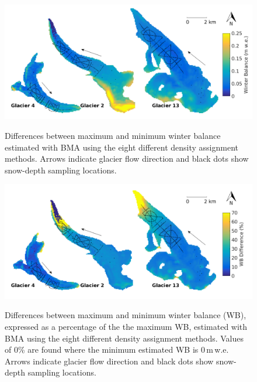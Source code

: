 \documentclass{sfuthesis}
\newcommand{\topomap}{Arrows indicate glacier flow direction and black dots show snow-depth sampling locations. }
\begin{document}
{\begin{figure}[H]
	\centering
	\includegraphics[width =\textwidth]{BMS_SWEdifferenceMap.png}\\
	\caption[Differences between maximum and minimum winter balance estimated with BMA using the eight different density assignment methods]{Differences between maximum and minimum winter balance estimated with BMA using the eight different density assignment methods. \topomap}
	\label{fig:BMS_SWEdiffMap}
\end{figure} 
 
 \begin{figure}[H]
	\centering
	\includegraphics[width =\textwidth]{BMS_SWEdifferenceMap_percent.png}\\
	\caption[Differences between maximum and minimum winter balance (WB), expressed as a percentage of the the maximum WB, estimated with BMA using the eight different density assignment methods]{Differences between maximum and minimum winter balance (WB), expressed as a percentage of the the maximum WB, estimated with BMA using the eight different density assignment methods. Values of 0\% are found where the minimum estimated WB is 0\,m\,w.e. \topomap}
	\label{fig:BMS_SWEdiffMap_precent}
\end{figure} 

}
\end{document}
